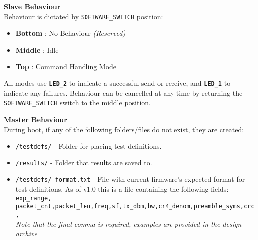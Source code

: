 \newpage\textbf{Slave Behaviour}\\
Behaviour is dictated by \texttt{SOFTWARE\_SWITCH} position:
\vspace{-5mm}
\begin{itemize}
	\item \textbf{Bottom} : No Behaviour \textit{(Reserved)}
	\item \textbf{Middle} : Idle
	\item \textbf{Top} : Command Handling Mode
\end{itemize}
All modes use \textbf{\texttt{LED\_2}} to indicate a successful send or receive, and  \textbf{\texttt{LED\_1}} to indicate any failures. Behaviour can be cancelled at any time by returning the \texttt{SOFTWARE\_SWITCH} switch to the middle position.

\textbf{Master Behaviour}\\
During boot, if any of the following folders/files do not exist, they are created:
\vspace{-5mm}
 \begin{itemize}
 \item \texttt{/testdefs/} - Folder for placing test definitions.
 \item \texttt{/results/} - Folder that results are saved to.
 \item \texttt{/testdefs/\_format.txt} - File with current firmware's expected format for test definitions. As of v1.0 this is a file containing the following fields: \texttt{exp\_range,\\packet\_cnt,packet\_len,freq,sf,tx\_dbm,bw,cr4\_denom,preamble\_syms,crc,}\\ \textit{Note that the final comma is required, examples are provided in the design archive}
 \end{itemize}


